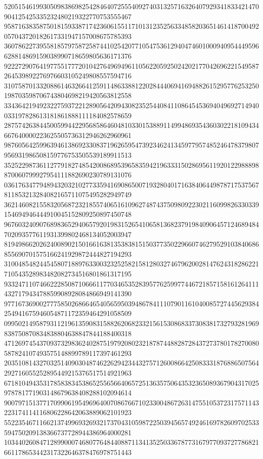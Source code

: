 \begin{DoxyCode}
      520515461993050983869825428464072555409274031325716326407929341833421470904125425335232480219322770753555467
      958716383587501815933871742360615511710131235256334858203651461418700492057043720182617331947157008675785393
      360786227395581857975872587441025420771054753612940474601000940954449596628814869159038990718659805636171376
      922272907641977551777201042764969496110562205925024202177042696221549587264539892276976603105249808557594716
      310758701332088614632664125911486338812202844406941694882615295776253250198703598706743804698219420563812558
      334364219492322759372212890564209430823525440841108645453694049692714940033197828613181861888111184082578659
      287574263844500599442295685864604810330153889114994869354360302218109434667640000223625505736312946262960961
      987605642599639461386923308371962659547392346241345977957485246478379807956931986508159776753505539189911513
      352522987361127791827485420086895396583594219633315028695611920122988898870060799927954111882690230789131076
      036176347794894320321027733594169086500719328040171638406449878717537567811853213284082165711075495282949749
      362146082155832056872321855740651610962748743750980922302116099826330339154694946444910045152809250897450748
      967603240907689836529406579201983152654106581368237919840906457124689484702093577611931399802468134052003947
      819498662026240089021501661638135383815150377350229660746279529103840686855690701575166241929872444827194293
      310048548244545807188976330032325258215812803274679620028147624318286221710543528983482082734516801861317195
      933247110746622285087106661177034653528395776259977446721857158161264111432717943478859908928084866949141390
      977167369002777585026866465405659503948678411107901161040085727445629384254941675946054871172359464291058509
      099502149587931121961359083158826206823321561530868337308381732793281969838750870834838804638847844188400318
      471269745437093732983624028751979208023218787448828728437273780178270080587824107493575148899789117397461293
      203510814327032514090304874622629423443275712600866425083331876886507564292716055252895449215376517514921963
      671810494353178583834538652556566406572513635750643532365089367904317025978781771903148679638408288102094614
      900797151377170990619549696400708676671023300486726314755105372317571143223174114116806228642063889062101923
      552235467116621374996932693217370431059872250394565749246169782609702533594750209138366737728944386964000281
      103440260847128990007468077648440887113413525033678773167977093727786821661178653442317322646378476978751443

\end{DoxyCode}
